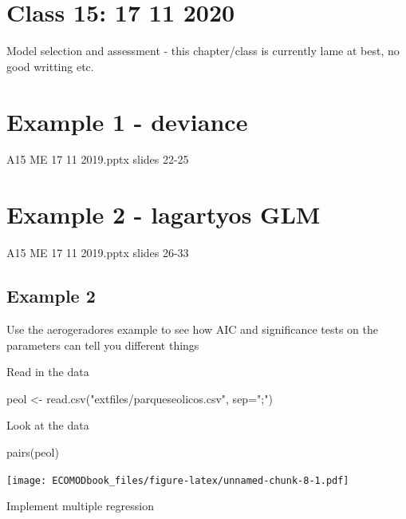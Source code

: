 \documentclass[
]{book}
\newenvironment{Shaded}{\begin{snugshade}}{\end{snugshade}}
\newcommand{\AttributeTok}[1]{\textcolor[rgb]{0.77,0.63,0.00}{#1}}
\newcommand{\FunctionTok}[1]{\textcolor[rgb]{0.00,0.00,0.00}{#1}}
\newcommand{\NormalTok}[1]{#1}
\newcommand{\OtherTok}[1]{\textcolor[rgb]{0.56,0.35,0.01}{#1}}
\newcommand{\StringTok}[1]{\textcolor[rgb]{0.31,0.60,0.02}{#1}}
\begin{document}
\hypertarget{aula15}{%
\chapter{Class 15: 17 11 2020}\label{aula15}}

Model selection and assessment - this chapter/class
is currently lame at best, no good writting etc.

\hypertarget{example-1---deviance}{%
\chapter{Example 1 - deviance}\label{example-1---deviance}}

A15 ME 17 11 2019.pptx
slides 22-25

\hypertarget{example-2---lagartyos-glm}{%
\chapter{Example 2 - lagartyos GLM}\label{example-2---lagartyos-glm}}

A15 ME 17 11 2019.pptx
slides 26-33

\hypertarget{example-2}{%
\section{Example 2}\label{example-2}}

Use the aerogeradores example to see how AIC and significance tests on the parameters can tell you different things

Read in the data

\begin{Shaded}
\begin{Highlighting}[]
\NormalTok{peol }\OtherTok{\textless{}{-}} \FunctionTok{read.csv}\NormalTok{(}\StringTok{"extfiles/parqueseolicos.csv"}\NormalTok{, }\AttributeTok{sep=}\StringTok{";"}\NormalTok{)}
\end{Highlighting}
\end{Shaded}

Look at the data

\begin{Shaded}
\begin{Highlighting}[]
\FunctionTok{pairs}\NormalTok{(peol)}
\end{Highlighting}
\end{Shaded}

\texttt{[image: ECOMODbook\_files/figure-latex/unnamed-chunk-8-1.pdf]}

Implement multiple regression
\end{document}
